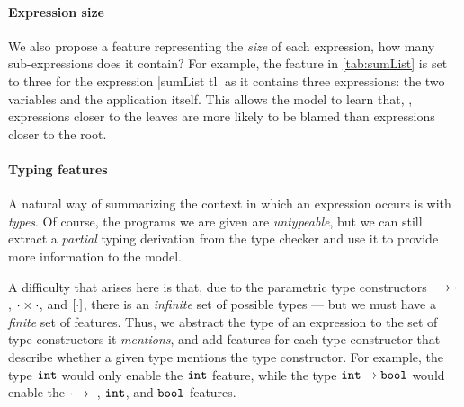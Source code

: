 
\paragraph{Expression size}
We also propose a feature representing the \emph{size} of each expression,
\ie how many sub-expressions does it contain?
%
For example, the \ExprSize feature in \autoref{tab:sumList} is set to three
for the expression |sumList tl| as it contains three expressions:
the two variables and the application itself.
%
This allows the model to learn that, \eg, expressions closer to the
leaves are more likely to be blamed than expressions closer to the root.

\paragraph{Typing features}
A natural way of summarizing the context in which an expression occurs
is with \emph{types}.
%
Of course, the programs we are given are \emph{untypeable}, but we can
still extract a \emph{partial} typing derivation from the type checker
and use it to provide more information to the model.

A difficulty that arises here is that, due to the parametric type
constructors $\cdot \rightarrow \cdot$, $\cdot \times \cdot$, and
$[\cdot]$, there is an \emph{infinite} set of possible types ---
but we must have a \emph{finite} set of features.
%
Thus, we abstract the type of an expression to the set of type
constructors it \emph{mentions}, and add features for each type
constructor that describe whether a given type mentions the type
constructor.
%
For example, the type $\mathtt{int}$ would only enable the $\mathtt{int}$ feature,
while the type $\mathtt{int} \rightarrow \mathtt{bool}$ would enable the
$\cdot \rightarrow \cdot$, $\mathtt{int}$, and $\mathtt{bool}$ features.

